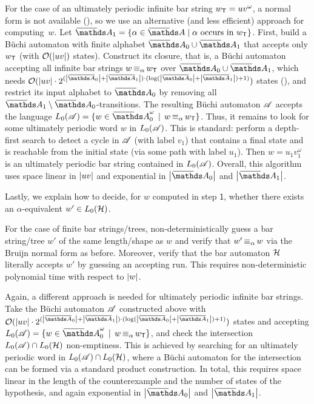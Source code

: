 \documentclass[a4paper,UKenglish,cleveref,autoref,thm-restate,numberwithinsect,final]{lipics-v2021}
\begin{document}
  For the case of an ultimately periodic infinite bar string $w_\textsf{T} = uv^\omega$, a normal
  form is not available (), so we use an alternative (and less efficient) approach for computing~$w$.
Let $\barNames_1=\set{\alpha\in \barNames\mid \text{$\alpha$ occurs in $w_\teach$}}$. First,
build a Büchi automaton with finite alphabet $\barNames_0\cup \barNames_1$ that accepts only
$w_\textsf{T}$ (with $\mathcal{O}(\card{uv})$ states). Construct its closure, that is, a Büchi automaton accepting all infinite bar strings $w\operatorname{\equiv_{\alpha}} w_\textsf{T}$ over $\barNames_0 \cup \barNames_1$, which needs $\mathcal{O}(\card{uv} \cdot 2^{(\card{\barNamess_0}+\card{\barNamess_1})\cdot (\log(\card{\barNamess_0}+\card{\barNamess_1}) + 1)})$ states (), and restrict its input alphabet to $\barNames_0$ by removing all $\barNames_1\setminus \barNames_0$-transitions. The resulting Büchi automaton $\mathscr{A}$ accepts the language $L_0(\A)=\setw{w \in \barAw_0}{w \alphaequiv w_\teach}$. Thus, it remains to look for some ultimately periodic word $w$ in $L_0(\mathscr{A})$. This is standard: perform a depth-first search to detect a cycle in $\mathscr{A}$ (with label $v_1$) that contains a final state and is reachable from the initial state (via some path with label $u_1$). Then $w=u_1v_1^\omega$ is an ultimately periodic bar string contained in $L_0(\mathscr{A})$. Overall, this algorithm uses space linear in $\card{uv}$ and exponential in
    $\card{\barNames_0}$ and $\card{\barNames_1}$.   

     Lastly, we explain how to decide, for $w$ computed in step $\mathsf{1}$, whether there exists an $\alpha$-equivalent $w'\in L_0(\mathcal{H})$.

    For the case of finite bar strings/trees, non-deterministically guess a bar string/tree
    $w'$ of the same length/shape as $w$ and verify that $w'\operatorname{\equiv_{\alpha}} w$ via the Bruijn normal form as before. Moreover, verify that the bar automaton $\mathcal{H}$ literally accepts $w'$ by guessing an accepting run. This requires
    non-deterministic polynomial time with respect to $\card{w}$.

    Again, a different approach is needed for ultimately periodic infinite bar strings. Take the Büchi automaton $\mathscr{A}$  constructed above with $\mathcal{O}(\card{uv} \cdot 2^{(\card{\barNamess_0}+\card{\barNamess_1})\cdot (\log(\card{\barNamess_0}+\card{\barNamess_1}) + 1)})$ states and accepting $L_0(\A)=\setw{w \in \barAw_0}{w \alphaequiv w_\teach}$, and check the intersection $L_0(\mathscr{A}) \cap L_0(\mathcal{H})$ non-emptiness. This is achieved by searching for an ultimately periodic word in \mbox{$L_0(\mathscr{A})\cap L_0(\mathcal{H})$}, where a Büchi automaton for the intersection can be formed via a standard product construction. In total, this requires space linear in the length of the counterexample and the
    number of states of the hypothesis, and again exponential in 
    $\card{\barNames_0}$ and $\card{\barNames_1}$.   
\end{document}
